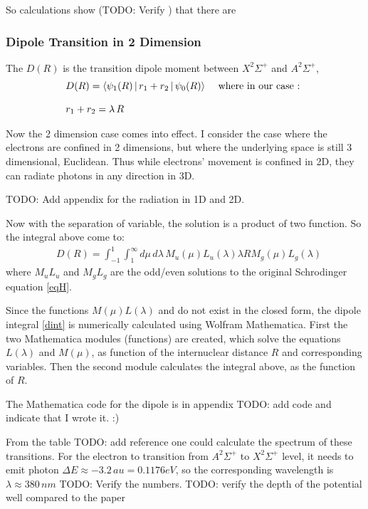 So calculations show (TODO: Verify ) that there are 

\subsubsection{Dipole Transition in 2 Dimension}

The $ D(R) $ is the transition dipole moment  between $ X^2\Sigma^{+} $  and $ A^2\Sigma^{+} $, \begin{equation}
\begin{split}
& D(R) = \Braket{\psi_1(R) | r_1 +  r_2 | \psi_0(R) } \,\,\,\,\,\text{ where in our case : } \\[.8em]
& r_1 + r_2 = \lambda\, R
\end{split}
\end{equation}

Now the 2 dimension case comes into effect. I consider the case where the electrons are confined in 2 dimensions, but where the underlying space is still 3 dimensional, Euclidean. Thus while electrons' movement is confined in 2D, they can radiate photons in any direction in 3D.

TODO: Add appendix for the radiation in 1D and 2D.

Now with the separation of variable, the solution is a product of two function. So the integral above come to:
\begin{equation}\label{dint}
\begin{split}
& D(R) = \int_{-1}^{1}{\int_{1}^{\infty}{ d\mu\, d\lambda\, M_u(\mu)L_u(\lambda)\lambda R M_g(\mu)L_g(\lambda) }}
\end{split}
\end{equation}
where $ M_uL_u $ and $ M_gL_g $ are the odd/even solutions to the original Schrodinger equation \eqref{eqH}.

Since the functions $ M(\mu)L(\lambda) $ and  do not exist in the closed form, the dipole integral \eqref{dint}  is numerically calculated using Wolfram Mathematica.  First the two Mathematica modules (functions) are created, which solve the equations $ L(\lambda) $ and $ M(\mu) $, as function of the internuclear distance $ R $ and corresponding variables. Then the second module calculates the integral above,  as the function of $ R $.

The Mathematica code for the dipole is in appendix TODO: add code and indicate that I wrote it. :)

From the table TODO: add reference one could calculate the spectrum of these transitions.  For the electron to transition from $ A^2\Sigma^{+} $ to $ X^2\Sigma^{+} $ level, it needs to emit photon $ \Delta E \approx  -3.2\,au = 0.1176 eV $, so the corresponding wavelength is $ \lambda \approx   380\,nm $  TODO: Verify the numbers.
TODO: verify the depth of the potential well compared to the paper \cite{H2Plus2d1}

